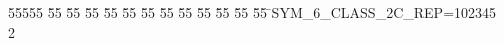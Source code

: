 %
%
\begin{tabbing}
55555 \= 55 \= 55 \= 55 \= 55 \= 55 \= 55 \= 55 \= 55 \= 55 \= 55 \= 55 \= 55 \= \>SYM\_6\_CLASS\_2C\_REP=102345\\[0pt]
2\>\end{tabbing}

